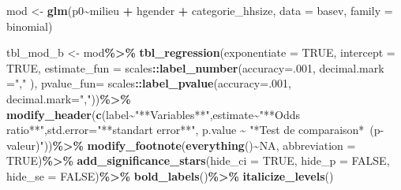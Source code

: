 \documentclass[
]{article}
\newenvironment{Shaded}{\begin{snugshade}}{\end{snugshade}}
\newcommand{\AttributeTok}[1]{\textcolor[rgb]{0.13,0.29,0.53}{#1}}
\newcommand{\ConstantTok}[1]{\textcolor[rgb]{0.56,0.35,0.01}{#1}}
\newcommand{\DecValTok}[1]{\textcolor[rgb]{0.00,0.00,0.81}{#1}}
\newcommand{\FunctionTok}[1]{\textcolor[rgb]{0.13,0.29,0.53}{\textbf{#1}}}
\newcommand{\NormalTok}[1]{#1}
\newcommand{\OtherTok}[1]{\textcolor[rgb]{0.56,0.35,0.01}{#1}}
\newcommand{\SpecialCharTok}[1]{\textcolor[rgb]{0.81,0.36,0.00}{\textbf{#1}}}
\newcommand{\StringTok}[1]{\textcolor[rgb]{0.31,0.60,0.02}{#1}}
\begin{document}
\begin{Shaded}
\begin{Highlighting}[]
\NormalTok{mod }\OtherTok{\textless{}{-}} \FunctionTok{glm}\NormalTok{(p0}\SpecialCharTok{\textasciitilde{}}\NormalTok{milieu }\SpecialCharTok{+}\NormalTok{ hgender }\SpecialCharTok{+}\NormalTok{ categorie\_hhsize,}
         \AttributeTok{data =}\NormalTok{ basev, }\AttributeTok{family =}\NormalTok{ binomial)}

\NormalTok{tbl\_mod\_b }\OtherTok{\textless{}{-}}\NormalTok{ mod}\SpecialCharTok{\%\textgreater{}\%}
  \FunctionTok{tbl\_regression}\NormalTok{(}\AttributeTok{exponentiate =} \ConstantTok{TRUE}\NormalTok{,}
                 \AttributeTok{intercept =} \ConstantTok{TRUE}\NormalTok{, }
                \AttributeTok{estimate\_fun =}\NormalTok{ scales}\SpecialCharTok{::}\FunctionTok{label\_number}\NormalTok{(}\AttributeTok{accuracy=}\NormalTok{.}\DecValTok{001}\NormalTok{,}
                                              \AttributeTok{decimal.mark =}\StringTok{","}\NormalTok{ ),}
                    \AttributeTok{pvalue\_fun=}\NormalTok{ scales}\SpecialCharTok{::}\FunctionTok{label\_pvalue}\NormalTok{(}\AttributeTok{accuracy=}\NormalTok{.}\DecValTok{001}\NormalTok{,}
                                            \AttributeTok{decimal.mark=}\StringTok{","}\NormalTok{))}\SpecialCharTok{\%\textgreater{}\%} 
  \FunctionTok{modify\_header}\NormalTok{(}\FunctionTok{c}\NormalTok{(label}\SpecialCharTok{\textasciitilde{}}\StringTok{"**Variables**"}\NormalTok{,estimate}\SpecialCharTok{\textasciitilde{}}\StringTok{"**Odds }
\StringTok{                  ratio**"}\NormalTok{,}\AttributeTok{std.error=}\StringTok{"**standart error**"}\NormalTok{,}
\NormalTok{                  p.value }\SpecialCharTok{\textasciitilde{}} \StringTok{"*Test de comparaison* (p{-}valeur)"}\NormalTok{))}\SpecialCharTok{\%\textgreater{}\%} 
  \FunctionTok{modify\_footnote}\NormalTok{(}\FunctionTok{everything}\NormalTok{()}\SpecialCharTok{\textasciitilde{}}\ConstantTok{NA}\NormalTok{, }\AttributeTok{abbreviation =} \ConstantTok{TRUE}\NormalTok{)}\SpecialCharTok{\%\textgreater{}\%}
  \FunctionTok{add\_significance\_stars}\NormalTok{(}\AttributeTok{hide\_ci =} \ConstantTok{TRUE}\NormalTok{, }\AttributeTok{hide\_p =} \ConstantTok{FALSE}\NormalTok{, }\AttributeTok{hide\_se =} \ConstantTok{FALSE}\NormalTok{)}\SpecialCharTok{\%\textgreater{}\%} 
  \FunctionTok{bold\_labels}\NormalTok{()}\SpecialCharTok{\%\textgreater{}\%} 
  \FunctionTok{italicize\_levels}\NormalTok{()}
\end{Highlighting}
\end{Shaded}
\end{document}
